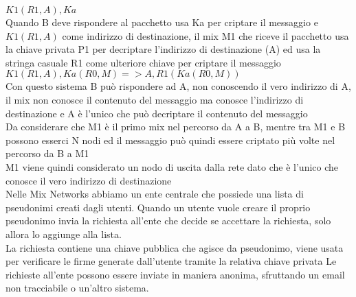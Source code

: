 $K1(R1, A), Ka$ \\
Quando B deve rispondere al pacchetto usa Ka per criptare il messaggio e $K1(R1, A)$ come indirizzo di destinazione, il mix M1 che riceve il pacchetto usa la chiave privata P1 per decriptare l'indirizzo di destinazione (A) ed usa la stringa casuale R1 come ulteriore chiave per criptare il messaggio \\
$K1( R1, A ), Ka( R0, M ) => A, R1( Ka( R0, M ) )$ \\
Con questo sistema B può rispondere ad A, non conoscendo il vero indirizzo di A, il mix non conosce il contenuto del messaggio ma conosce l'indirizzo di destinazione e A è l'unico che può decriptare il contenuto del messaggio \\
Da considerare che M1 è il primo mix nel percorso da A a B, mentre tra M1 e B possono esserci N nodi ed il messaggio può quindi essere criptato più volte nel percorso da B a M1 \\
M1 viene quindi considerato un nodo di uscita dalla rete dato che è l'unico che conosce il vero indirizzo di destinazione \\
Nelle Mix Networks abbiamo un ente centrale che possiede una lista di pseudonimi creati dagli utenti. Quando un utente vuole creare il proprio pseudonimo invia la richiesta all'ente che decide se accettare la richiesta, solo allora lo aggiunge alla lista. \\
La richiesta contiene una chiave pubblica che agisce da pseudonimo, viene usata per verificare le firme generate dall'utente tramite la relativa chiave privata 
Le richieste all'ente possono essere inviate in maniera anonima, sfruttando un email non tracciabile o un'altro sistema. \\



\cite{ChaumMixes}